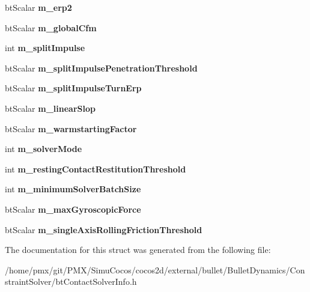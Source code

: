 \begin{DoxyCompactItemize}
bt\+Scalar {\bfseries m\+\_\+erp2}
\item 
\mbox{\label{structbtContactSolverInfoData_ab527236636f1cc7827a20aad92345f9b}} 
bt\+Scalar {\bfseries m\+\_\+global\+Cfm}
\item 
\mbox{\label{structbtContactSolverInfoData_a51a0186cf57ca7931d81d6ad1391c121}} 
int {\bfseries m\+\_\+split\+Impulse}
\item 
\mbox{\label{structbtContactSolverInfoData_a3a520832d80e1125c2ac74e4d08a7d48}} 
bt\+Scalar {\bfseries m\+\_\+split\+Impulse\+Penetration\+Threshold}
\item 
\mbox{\label{structbtContactSolverInfoData_abef654f8a7434fbaa9e11f509ae98565}} 
bt\+Scalar {\bfseries m\+\_\+split\+Impulse\+Turn\+Erp}
\item 
\mbox{\label{structbtContactSolverInfoData_a9b28607cd2bb4d8449041e4feb9febe9}} 
bt\+Scalar {\bfseries m\+\_\+linear\+Slop}
\item 
\mbox{\label{structbtContactSolverInfoData_a826d63892ebc1328d85cb2f9cd667da4}} 
bt\+Scalar {\bfseries m\+\_\+warmstarting\+Factor}
\item 
\mbox{\label{structbtContactSolverInfoData_a5fecc357abf0c98e07674aa3ddd250c3}} 
int {\bfseries m\+\_\+solver\+Mode}
\item 
\mbox{\label{structbtContactSolverInfoData_a36260c73357a3b4c0734947d83698111}} 
int {\bfseries m\+\_\+resting\+Contact\+Restitution\+Threshold}
\item 
\mbox{\label{structbtContactSolverInfoData_aac552c86c489bc1bc70a08704fc16851}} 
int {\bfseries m\+\_\+minimum\+Solver\+Batch\+Size}
\item 
\mbox{\label{structbtContactSolverInfoData_a8fd37c9783ffcca34137a21f0624ec5d}} 
bt\+Scalar {\bfseries m\+\_\+max\+Gyroscopic\+Force}
\item 
\mbox{\label{structbtContactSolverInfoData_ae700464b3c0e463affd7c126a695ff81}} 
bt\+Scalar {\bfseries m\+\_\+single\+Axis\+Rolling\+Friction\+Threshold}
\end{DoxyCompactItemize}


The documentation for this struct was generated from the following file\+:\begin{DoxyCompactItemize}
\item 
/home/pmx/git/\+P\+M\+X/\+Simu\+Cocos/cocos2d/external/bullet/\+Bullet\+Dynamics/\+Constraint\+Solver/bt\+Contact\+Solver\+Info.\+h\end{DoxyCompactItemize}
